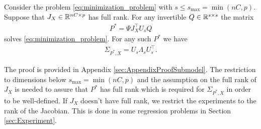 \begin{theorem}
\label{thm:OptSubmodel}
Consider the problem \eqref{eq:minimization_problem} with $s\leq s_{\mathrm{max}}=\min(nC,p)$.
Suppose that $J_X\in \mathbb{R}^{nC\times p}$ has full rank. For any invertible $Q\in \mathbb{R}^{s\times s}$ the matrix
\begin{align}
    \label{eq:optimal_P}
    P^* = \Psi J_X^\intercal U_s Q
\end{align}
solves \eqref{eq:minimization_problem}.
 For any such $P^*$ we have
\begin{align}
    \label{eq:low_rank_laplace_optimal_Sigma}
    \Sigma_{P^*,X} = U_s \Lambda_s U_s^\intercal.
\end{align}
\end{theorem}

The proof is provided in Appendix \ref{sec:AppendixProofSubmodel}.
The restriction to dimensions below $s_{\mathrm{max}} = \min(nC,p)$ and the assumption on the full rank of $J_X$ is needed to assure that $P^*$ has full rank which is required for $\Sigma_{P^*,X}$ in order to be well-defined. If $J_X$ doesn't have full rank, we restrict the experiments to the rank of the Jacobian. This is done in some regression problems in Section \ref{sec:Experiment}.

